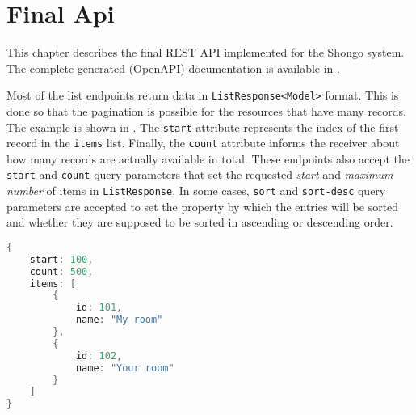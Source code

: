 \chapter{Final Api} \label{cha:api}
This chapter describes the final REST API implemented for the Shongo system. The complete generated (OpenAPI) documentation is available in .

Most of the list endpoints return data in \texttt{ListResponse<Model>} format. This is done so that the pagination is possible for the resources that have many records. The example is shown in . The \texttt{start} attribute represents the index of the first record in the \texttt{items} list. Finally, the \texttt{count} attribute informs the receiver about how many records are actually available in total.
These endpoints also accept the \texttt{start} and \texttt{count} query parameters that set the requested \emph{start} and \emph{maximum number} of items in \texttt{ListResponse}.
In some cases, \texttt{sort} and \texttt{sort-desc} query parameters are accepted to set the property by which the entries will be sorted and whether they are supposed to be sorted in ascending or descending order.

\begin{lstlisting}[language=Java, caption=ListResponse, label=lst:listresponse]
{
    start: 100,
    count: 500,
    items: [
        {
            id: 101,
            name: "My room"
        },
        {
            id: 102,
            name: "Your room"
        }
    ]
}
\end{lstlisting}









